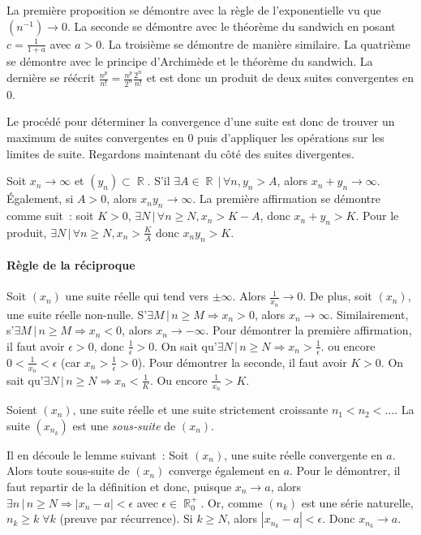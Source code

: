 \documentclass{article}
\DeclareMathOperator{\R}{\mathbb R}
\theoremstyle{definition}
\theoremstyle{remark}
\begin{document}
			La première proposition se démontre avec la règle de l'exponentielle vu que $(n^{-1}) \to 0$. La seconde se démontre avec le théorème du sandwich en
			posant $c = \frac {1}{1+a}$ avec $a > 0$. La troisième se démontre de manière similaire. La quatrième se démontre avec le principe d'Archimède et le théorème du
			sandwich. La dernière se réécrit $\frac {n^p}{n!} = \frac {n^p}{2^n}\frac {2^n}{n!}$ et est donc un produit de deux suites convergentes en 0.

			Le procédé pour déterminer la convergence d'une suite est donc de trouver un maximum de suites convergentes en 0 puis d'appliquer les opérations sur les
			limites de suite. Regardons maintenant du côté des suites divergentes.

			Soit $x_n \to \infty$ et $(y_n) \subset \R$. S'il $\exists A \in \R \, | \, \forall n, y_n > A$, alors $x_n + y_n \to \infty$. Également, si $A > 0$,
			alors $x_ny_n \to \infty$. La première affirmation se démontre comme suit~: soit $K > 0$, $\exists N \, | \, \forall n \geq N, x_n > K - A$, donc
			$x_n + y_n > K$. Pour le produit, $\exists N \, | \, \forall n \geq N, x_n > \frac KA$ donc $x_ny_n > K$.

			\paragraph{Règle de la réciproque} Soit $(x_n)$ une suite réelle qui tend vers $\pm \infty$. Alors $\frac1{x_n} \to 0$. De plus, soit $(x_n)$, une
			suite réelle non-nulle. S'$\exists M \, | \, n \geq M \Rightarrow x_n > 0$, alors $x_n \to \infty$. Similairement, s'$\exists M \, | \, n \geq M
			\Rightarrow x_n < 0$, alors $x_n \to -\infty$. Pour démontrer la première affirmation, il faut avoir $\epsilon > 0$, donc $\frac 1\epsilon > 0$.
			On sait qu'$\exists N \, | \, n \geq N \Rightarrow x_n > \frac 1\epsilon$. ou encore $0 < \frac 1{x_n} < \epsilon$ (car $x_n > \frac 1\epsilon > 0$).
			Pour démontrer la seconde, il faut avoir $K > 0$. On sait qu'$\exists N \, | \, n \geq N \Rightarrow x_n < \frac 1K$. Ou encore $\frac 1{x_n} > K$.

			Soient $(x_n)$, une suite réelle et une suite strictement croissante $n_1 < n_2 < \ldots$. La suite $(x_{n_k})$ est une \textit{sous-suite} de $(x_n)$.

			Il en découle le lemme suivant~: Soit $(x_n)$, une suite réelle convergente en $a$. Alors toute sous-suite de $(x_n)$ converge également en $a$.
			Pour le démontrer, il faut repartir de la définition et donc, puisque $x_n \to a$, alors $\exists n \, | \, n \geq N \Rightarrow |x_n - a| < \epsilon$
			avec $\epsilon \in \R^+_0$. Or, comme $(n_k)$ est une série naturelle, $n_k \geq k \; \forall k$ (preuve par récurrence). Si $k \geq N$,
			alors $|x_{n_k} - a| < \epsilon$. Donc $x_{n_k} \to a$.
\end{document}
